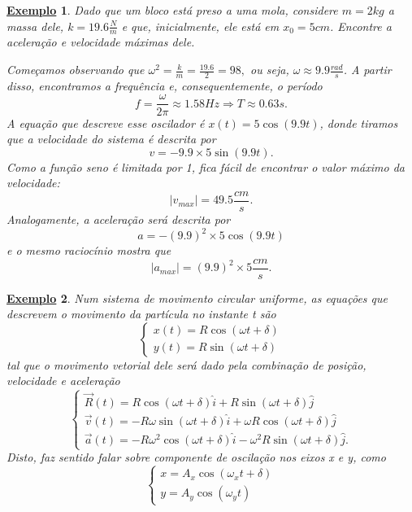 \documentclass{article}
\newtheorem{example}{\underline{Exemplo}}
\begin{document}
\begin{example}
  Dado que um bloco está preso a uma mola, considere \(m=2kg\) a massa dele, \(k = 19.6\frac{N}{m}\) e que, inicialmente,
  ele está em \(x_{0} = 5cm\). Encontre a aceleração e velocidade máximas dele.

  Começamos observando que \(\omega^{2} = \frac{k}{m} = \frac{19.6}{2} = 98,\) ou seja, \(\omega \approx 9.9 \frac{rad}{s}\).
  A partir disso, encontramos a frequência e, consequentemente, o período 
  \[
    f = \frac{\omega }{2\pi }\approx 1.58Hz \Rightarrow T\approx 0.63s.
  \]
  A equação que descreve esse oscilador é \(x(t) = 5\cos{(9.9t)}\), donde tiramos que a velocidade do sistema é descrita por 
  \[
    v = -9.9\times 5\sin{(9.9t)}.
  \]
  Como a função seno é limitada por 1, fica fácil de encontrar o valor máximo da velocidade: 
  \[
    |v_{max}| = 49.5 \frac{cm}{s}.
  \]
  Analogamente, a aceleração será descrita por 
  \[
    a = -(9.9)^{2}\times 5\cos{(9.9t)}
  \]
  e o mesmo raciocínio mostra que 
  \[
    |a_{max}| = (9.9)^{2}\times 5 \frac{cm}{s}.
  \]
\end{example}
\begin{example}
  Num sistema de movimento circular uniforme, as equações que descrevem o movimento da partícula no instante t são 
  \[
    \left\{\begin{array}{ll}
        x(t) = R\cos{(\omega t + \delta )}\\
        y(t) = R\sin{(\omega t + \delta )}
    \end{array}\right.
  \] 
  tal que o movimento vetorial dele será dado pela combinação de posição, velocidade e aceleração 
  \[
    \left\{\begin{array}{ll}
        \vec{R}(t) = R\cos{(\omega t + \delta )}\hat{i} + R\sin{(\omega t + \delta )}\hat{j}\\
        \vec{v}(t) = -R\omega \sin{(\omega t + \delta )}\hat{i} + \omega R\cos{(\omega t + \delta )}\hat{j}\\
        \vec{a}(t) = -R\omega ^{2}\cos{(\omega t + \delta )}\hat{i} - \omega ^{2}R\sin{(\omega t + \delta )}\hat{j}.
    \end{array}\right.
  \]
  Disto, faz sentido falar sobre componente de oscilação nos eixos x e y, como 
  \[
    \left\{\begin{array}{ll}
        x = A_{x}\cos{(\omega_{x}t + \delta )}\\
        y = A_{y}\cos{(\omega_{y}t)}
    \end{array}\right.
  \]
\end{example}
\end{document}
